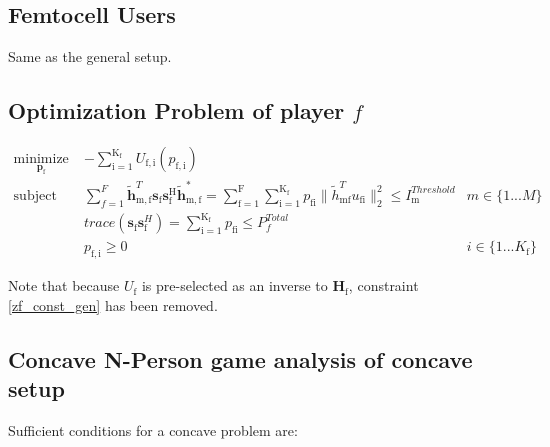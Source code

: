 \documentclass[12pt,a4paper]{report}
\begin{document}
\subsection{Femtocell Users}
Same as the general setup.

\subsection{Optimization Problem of player $f$}


	\begin{subequations}
	\label{optim}
	\begin{align}
	    \underset{\mathbf{p}_{\mathrm{f}} }{\text{minimize}} \;
	    & - \sum_{\mathrm{i=1}}^{\mathrm{K_f}}
    	U_{\mathrm{f,i}}(p_{\mathrm{f,i}}) \label{player_opt_c} \\
	    \text{subject to} \; &
	  \sum^F_{f=1} \mathbf{\tilde{h}}_{\mathrm{m,f}}^T  \mathbf{s}_{\mathrm{f}} 						
	\mathbf{s_{\mathrm{f}}^{\mathrm{H}}} \mathbf{\tilde{h}_{\mathrm{m,f}}^*} 
	=
	\sum_{\mathrm{f=1}}^{\mathrm{F}}	\sum_{\mathrm{i=1}}^{\mathrm{K_f}}
	p_{\mathrm{fi}}\|\tilde{h}_{\mathrm{mf}}^T u_{\mathrm{fi}}\|^2_2
	\leq I^{Threshold}		
	_{\mathrm{m}} & m \in \{1 ...M\} 
		\label{interference_const_c}\\
        & trace(\mathbf{s}_\mathrm{f}\mathbf{s}_\mathrm{f}^H) =
        	\sum_{\mathrm{i=1}}^{\mathrm{K_{\mathrm{f}}}} p_{\mathrm{fi}}
	   \leq P^{Total}_{f}  \label{power_const_c}\\
        & p_{\mathrm{f,i}} \geq 0 &  i \in \{1 ...K_{\mathrm{f}}\} \label{pos_power_const_c}
	\end{align}
	\end{subequations}

Note that because $U_{\mathrm{f}}$ is pre-selected as an inverse to  $\mathbf{H_\mathrm{f}}$, constraint \eqref{zf_const_gen} has been removed.
\subsection{Concave N-Person game analysis of concave setup}

Sufficient conditions for a concave problem are:
\end{document}

